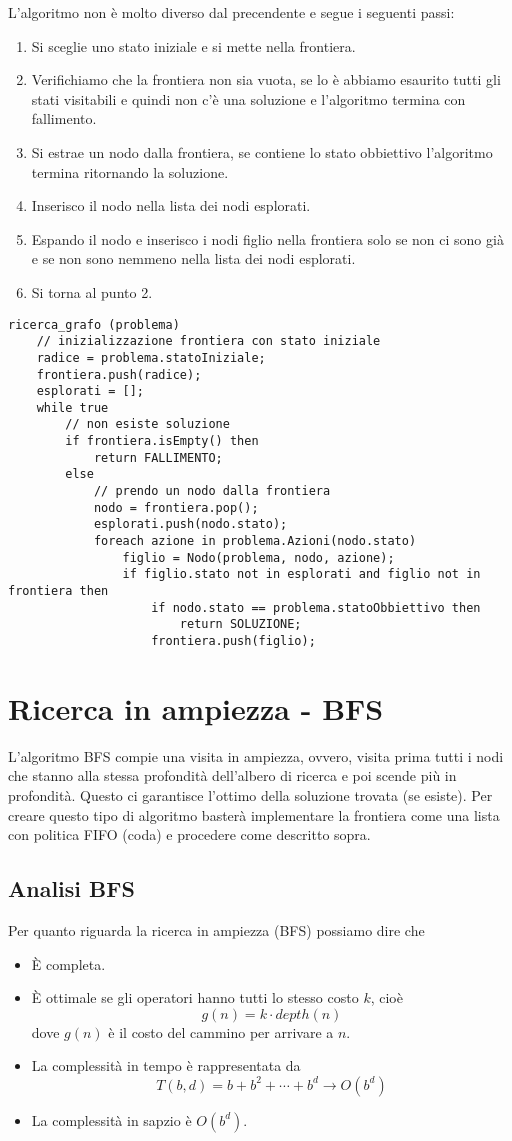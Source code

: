 L'algoritmo non \`e molto diverso dal precendente e segue i seguenti passi:
\begin{enumerate}
	\item Si sceglie uno stato iniziale e si mette nella frontiera.
	\item Verifichiamo che la frontiera non sia vuota, se lo \`e abbiamo esaurito tutti gli
	      stati visitabili e quindi non c'\`e una soluzione e l'algoritmo termina con
	      fallimento.
	\item Si estrae un nodo dalla frontiera, se contiene lo stato obbiettivo l'algoritmo
	      termina ritornando la soluzione.
	\item Inserisco il nodo nella lista dei nodi esplorati.
	\item Espando il nodo e inserisco i nodi figlio nella frontiera solo se non ci sono gi\`a
	      e se non sono nemmeno nella lista dei nodi esplorati.
	\item Si torna al punto 2.
\end{enumerate}
\newpage
\begin{lstlisting}[style=pseudo-style]
ricerca_grafo (problema)
	// inizializzazione frontiera con stato iniziale
	radice = problema.statoIniziale;
	frontiera.push(radice);
	esplorati = [];
	while true
		// non esiste soluzione
		if frontiera.isEmpty() then
			return FALLIMENTO;
		else
			// prendo un nodo dalla frontiera
			nodo = frontiera.pop();
			esplorati.push(nodo.stato);
			foreach azione in problema.Azioni(nodo.stato)
				figlio = Nodo(problema, nodo, azione);
				if figlio.stato not in esplorati and figlio not in frontiera then
					if nodo.stato == problema.statoObbiettivo then
						return SOLUZIONE;
					frontiera.push(figlio);
\end{lstlisting}

\section{Ricerca in ampiezza - BFS}
L'algoritmo BFS compie una visita in ampiezza, ovvero, visita prima tutti i nodi che stanno
alla stessa profondit\`a dell'albero di ricerca e poi scende pi\`u in profondit\`a.
Questo ci garantisce l'ottimo della soluzione trovata (se esiste). Per creare questo
tipo di algoritmo baster\`a implementare la frontiera come una lista con politica FIFO
(coda) e procedere come descritto sopra.

\subsection{Analisi BFS}
Per quanto riguarda la ricerca in ampiezza (BFS) possiamo dire che
\begin{itemize}
	\item \`E completa.
	\item \`E ottimale se gli operatori hanno tutti lo stesso costo $k$, cio\`e
	      \[ g(n) = k \cdot depth(n) \]
	      dove $g(n)$ \`e il costo del cammino per arrivare a $n$.
	\item La complessit\`a in tempo \`e rappresentata da
	      \[ T(b, d) = b + b^2 + \cdots + b^d \rightarrow O(b^d) \]
	\item La complessit\`a in sapzio \`e $O(b^d)$.
\end{itemize}

